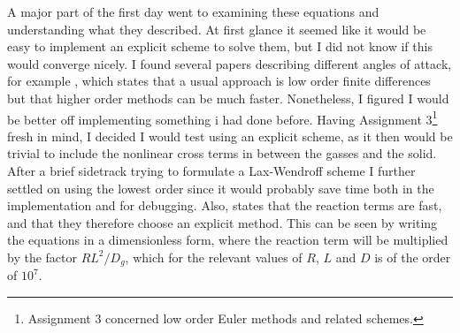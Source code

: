 \documentclass[1p]{elsarticle}        	%
\begin{document}
A major part of the first day went to examining these equations and understanding what they described. 
At first glance it seemed like it would be easy to implement an explicit scheme to solve them, but I did not know if this would converge nicely. 
I found several papers describing different angles of attack, for example \cite{kassam}, which states that a usual approach is low order finite differences but that higher order methods can be much faster. 
Nonetheless, I figured I would be better off implementing something i had done before. 
Having Assignment 3\footnote{Assignment 3 concerned low order Euler methods and related schemes.} fresh in mind, I decided I would test using an explicit scheme, as it then would be trivial to include the nonlinear cross terms in between the gasses and the solid.
 After a brief sidetrack trying to formulate a Lax-Wendroff scheme I further settled on using the lowest order since it would probably save time both in the implementation and for debugging. 
 Also, \cite{einarsrud} states that the reaction terms are fast, and that they therefore choose an explicit method. 
 This can be seen by writing the equations in a dimensionless form, where the reaction term will be multiplied by the factor $RL^2/D_g$, which for the relevant values of $R$, $L$ and $D$ is of the order of $10^7$.
\end{document}
